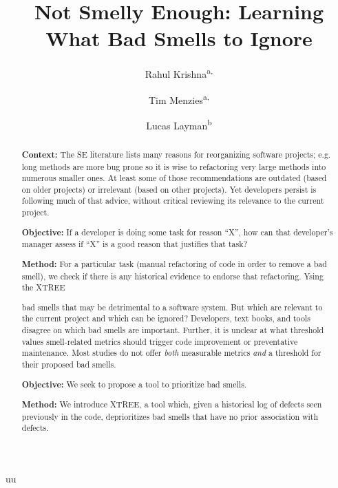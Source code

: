 uu \documentclass[final,twocolumn,5p]{elsarticle}
\theoremstyle{break}
\begin{document}
\begin{frontmatter}

\title{Not Smelly Enough:  Learning What Bad Smells to Ignore}

\author{Rahul Krishna\textsuperscript{a,}}
\author{Tim Menzies\textsuperscript{a,}}
\author{Lucas Layman\textsuperscript{b}}
\address{\textsuperscript{a}Department of Computer Science, North Carolina State University, Raleigh, NC, USA\\
\textsuperscript{b}Fraunhofer CESE, College Park, USA}
\pagestyle{arabic}

\begin{abstract} 
{\bf Context: }The SE literature lists many  reasons
for reorganizing software projects; e.g. long methods are more bug prone
so it is wise to refactoring
very large methods into numerous smaller ones.
At least some of those recommendations are outdated (based on older projects)
or irrelevant (based on other projects). Yet developers persist
is following much of that advice, without critical reviewing
its relevance to the current project. 

{\bf Objective:} If a developer is doing some task for reason ``X'', 
how can that developer's manager assess if ``X'' is a good reason
that justifies that task? 

{\bf Method:} For a particular task (manual refactoring of code in order
to remove a bad smell), we check   if there is any historical evidence
to endorse that refactoring.  Ysing the XTREE

bad smells that may be detrimental to a software system. But which are relevant to the current project and which can be ignored?
Developers, text books, and tools disagree on which bad smells are important. 
Further, it is unclear at what threshold values smell-related metrics
should trigger code improvement or preventative maintenance. Most studies do not offer {\em both} measurable metrics {\em and} a threshold for their proposed bad smells.

\noindent 
{\bf Objective: }We seek to propose a tool to prioritize  bad  smells.

\noindent
{\bf Method: } We introduce XTREE, a tool which, given a historical log of defects seen previously in the code, deprioritizes bad smells that have no prior association with defects. 


\end{abstract}
\end{frontmatter}
\end{document}
